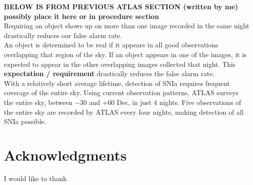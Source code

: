 \documentclass[aps,prb,twocolumn,superscriptaddress]{revtex4-1}
\begin{document}
{\bf \noindent BELOW IS FROM PREVIOUS ATLAS SECTION (written by me)
\indent possibly place it here or in procedure section}\\
Requiring an object shows up on more than one image recorded in the same night 
drastically reduces our false alarm rate.\\
An object is determined to be real if it appears in all good 
observations overlapping that region of the sky. 
If an object appears in one of the images, it is expected to appear 
in the other overlapping images collected that night.
This {\bf expectation / requirement} drastically reduces the false alarm rate.\\
\indent With a relatively short average lifetime, detection of SNIa requires 
frequent coverage of the entire sky. Using current observation patterns,
ATLAS surveys the entire sky, between $-30$ and $+60$ Dec, in just 4 nights. 
Five observations of the entire sky are recorded by ATLAS every four nights, 
making detection of all SNIa possible.




\section*{Acknowledgments}
I would like to thank   %
\end{document}
